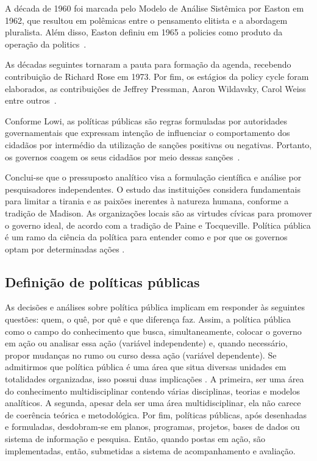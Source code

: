 A década de 1960 foi marcada pelo Modelo de Análise Sistêmica por Easton em 1962, que resultou em polêmicas entre o pensamento elitista e a abordagem pluralista. Além disso, Easton definiu em 1965 a policies como produto da operação da politics~\cite{rua2013}.

As décadas seguintes tornaram a pauta para formação da agenda, recebendo contribuição de Richard Rose em 1973. 
Por fim, os estágios da policy cycle foram elaborados, as contribuições de Jeffrey Pressman, Aaron Wildavsky, Carol Weiss entre outros~\cite{rua2013}.

Conforme Lowi, as políticas públicas são regras formuladas por autoridades governamentais que expressam intenção de influenciar o comportamento dos cidadãos por intermédio da utilização de sanções positivas ou negativas. 
Portanto, os governos coagem os seus cidadãos por meio dessas sanções~\cite{rua2013}. 

Conclui-se que o pressuposto analítico visa a formulação científica e análise por pesquisadores independentes. 
O estudo das instituições considera fundamentais para limitar a tirania e as paixões inerentes à natureza humana, conforme a tradição de Madison. 
As organizações locais são as virtudes cívicas para promover o governo ideal, de acordo com a tradição de Paine e Tocqueville. 
Política pública é um ramo da ciência da política para entender como e por que os governos optam por determinadas ações \cite{souza2006politicas}.


\subsection{Definição de políticas públicas}


As decisões e análises sobre política pública implicam em responder às seguintes questões: quem, o quê, por quê e que diferença faz.
Assim, a política pública como o campo do conhecimento que busca, simultaneamente, colocar o governo em ação ou analisar essa ação (variável independente) e, quando necessário, propor mudanças no rumo ou curso dessa ação (variável dependente).
Se admitirmos que política pública é uma área que situa diversas unidades em totalidades organizadas, isso possui duas implicações \cite{souza2006politicas}. 
A primeira, ser uma área do conhecimento multidisciplinar contendo várias disciplinas, teorias e modelos analíticos.
A segunda, apesar dela ser uma área multidisciplinar, ela não carece de coerência teórica e metodológica.
Por fim, políticas públicas, após desenhadas e formuladas, desdobram-se em planos, programas, projetos, bases de dados ou sistema de informação e pesquisa. 
Então, quando postas em ação, são implementadas, então, submetidas a sistema de acompanhamento e avaliação.


